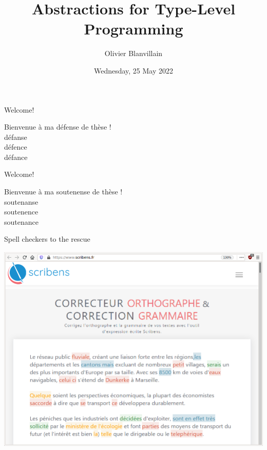 \documentclass[10pt]{beamer}
\title{Abstractions for Type-Level Programming}
\date{Wednesday, 25 May 2022}
\author{Olivier Blanvillain}
\newenvironment{slide}[2][]
  {\begin{frame}[fragile,environment=slide,#1]{#2}}
  {\end{frame}}
\begin{document}
\maketitle

\begin{slide}{Welcome!}
\Large
\begin{center}
Bienvenue à ma déf\textcolor{typeColor}{ense} de thèse !\\
\phantom{Bienvenue à ma} déf\textcolor{implColor}{anse} \phantom{de thèse !}\\
\phantom{Bienvenue à ma} déf\textcolor{singColor}{ence} \phantom{de thèse !}\\
\phantom{Bienvenue à ma} déf\textcolor{mtpeColor}{ance} \phantom{de thèse !}\\
\end{center}
\end{slide}

\begin{slide}{Welcome!}
\Large
\begin{center}
Bienvenue à ma souten\textcolor{typeColor}{ense} de thèse !\\
\phantom{Bienvenue à ma} souten\textcolor{implColor}{anse} \phantom{de thèse !}\\
\phantom{Bienvenue à ma} souten\textcolor{singColor}{ence} \phantom{de thèse !}\\
\phantom{Bienvenue à ma} souten\textcolor{mtpeColor}{ance} \phantom{de thèse !}\\
\end{center}
\end{slide}

\begin{slide}{Spell checkers to the rescue}
\begin{center}
\includegraphics[width=\textwidth]{figures/scribens.png}
\end{center}
\end{slide}
\end{document}
